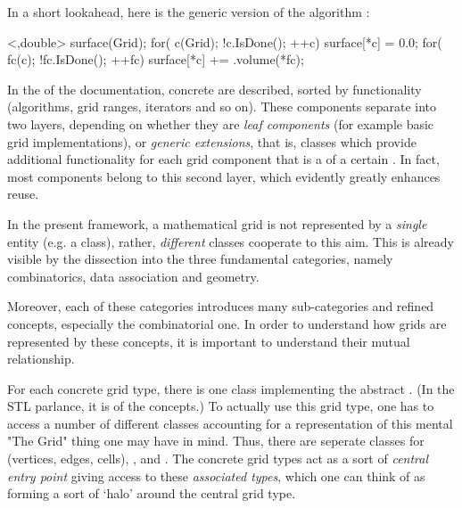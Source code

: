  In a short lookahead, here is the generic version of the 
 algorithm  :

 \begin{example}
<,double> surface(Grid);
for( c(Grid); !c.IsDone(); ++c) {
  surface[*c] = 0.0; 
  for( fc(c); !fc.IsDone(); ++fc)
    surface[*c] += .volume(*fc);
}
 \end{example}

 In the  of the documentation,
 concrete 
 are described, sorted by functionality 
 (algorithms, grid ranges, iterators and so on).
 These components separate into two layers, 
 depending on whether they are  \emph{leaf components\/}
 (for example basic grid implementations),
 or \emph{generic extensions}, that is, 
 classes which provide additional functionality 
 for each grid component that is a  of a certain .
 In fact, most components belong to this second layer,
 which evidently greatly enhances reuse.
  
  \bigsep 

  In the present framework, a mathematical grid is not represented by a {\em single\/}
  entity (e.g. a class), 
  rather, {\em different\/} classes cooperate to this aim.
  This is already visible by the dissection into the three fundamental categories,
  namely combinatorics, data association and geometry.
  
  Moreover, each of these categories introduces many sub-categories 
  and refined concepts, 
  especially the combinatorial one.
  In order to understand how grids are represented by these concepts,
  it is important to understand their mutual relationship.

  For each concrete grid type, there is one class implementing
  the abstract .
  {\small (In the STL parlance, it is  of the concepts.)}
  To actually use this grid type, one has to access a number of
  different classes accounting for a representation 
  of this mental "The Grid" thing one may have in mind.
  Thus, there are seperate classes for 
   (vertices, edges, cells),
  ,
  and .
  The concrete grid types act as a sort of {\em central entry point\/} 
  giving access to these {\sl associated types\/},
  which one can think of  as  forming a sort of `halo'
  around the central grid type.

